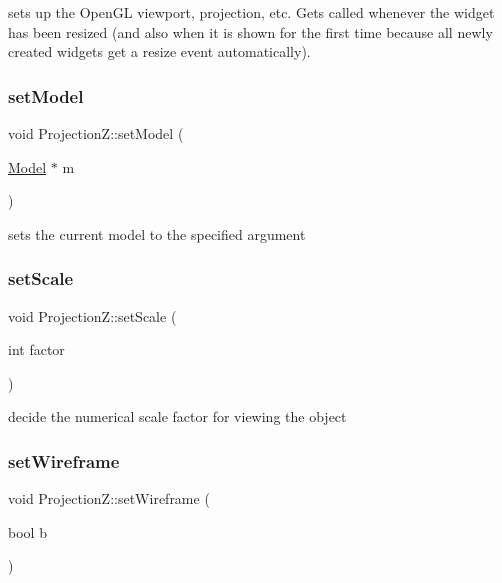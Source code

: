 sets up the Open\+GL viewport, projection, etc. Gets called whenever the widget has been resized (and also when it is shown for the first time because all newly created widgets get a resize event automatically). 

\mbox{\label{class_projection_z_af65afd9bf93b40bbf626cd2fba303b3f}} 
\subsubsection{\texorpdfstring{set\+Model}{setModel}}
{\footnotesize\ttfamily void Projection\+Z\+::set\+Model (\begin{DoxyParamCaption}\item[{\mbox{\hyperlink{class_model}{Model}} $\ast$}]{m }\end{DoxyParamCaption})\hspace{0.3cm}{\ttfamily [slot]}}



sets the current model to the specified argument 

\mbox{\label{class_projection_z_a21e56fe128f64983203888507845847d}} 
\subsubsection{\texorpdfstring{set\+Scale}{setScale}}
{\footnotesize\ttfamily void Projection\+Z\+::set\+Scale (\begin{DoxyParamCaption}\item[{int}]{factor }\end{DoxyParamCaption})\hspace{0.3cm}{\ttfamily [slot]}}



decide the numerical scale factor for viewing the object 

\mbox{\label{class_projection_z_a61a7115d258f9324b5f697983dd5ca3d}} 
\subsubsection{\texorpdfstring{set\+Wireframe}{setWireframe}}
{\footnotesize\ttfamily void Projection\+Z\+::set\+Wireframe (\begin{DoxyParamCaption}\item[{bool}]{b }\end{DoxyParamCaption})\hspace{0.3cm}{\ttfamily [slot]}}



